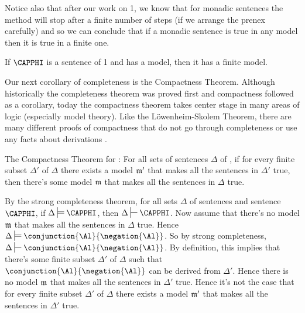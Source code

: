 Notice also that after our work on \GQL{}1, we know that for monadic sentences the method will stop after a finite number of steps (if we arrange the prenex carefully) and so we can conclude that if a monadic sentence is true in any model then it is true in a finite one. 
\begin{THEOREM}{}
If $\CAPPHI$ is a sentence of \GQL{}1 and has a model, then it has a finite model.
\end{THEOREM}

Our next corollary of completeness is the Compactness Theorem.
Although historically the completeness theorem was proved first and compactness followed as a corollary, today the compactness theorem takes center stage in many areas of logic (especially model theory). 
Like the L\"owenheim-Skolem Theorem, there are many different proofs of compactness that do not go through completeness or use any facts about derivations \citetext{see \citealt[321]{Kleene1967}, \citealt{Ebbinghaus1985}, \citealt[ch.~5.1]{Hodges1997}, \citealp[63]{Hodges2001}, \citeyear[29]{Hodges2001b}}. 
\begin{THEOREM}{ The Compactness Theorem for \GQL{}:}
For all sets of sentences $\Delta$ of \GQL{}, if for every finite subset $\Delta'$ of $\Delta$ there exists a model $\mathfrak{m}'$ that makes all the sentences in $\Delta'$ true, then there's some model $\mathfrak{m}$ that makes all the sentences in $\Delta$ true. 
\end{THEOREM}
\begin{PROOF}
By the strong completeness theorem, for all sets $\Delta$ of \GQL{} sentences and \GQL{} sentence $\CAPPHI$, if $\Delta\sdtstile{}{}\CAPPHI$, then $\Delta\sststile{}{}\CAPPHI$.
Now assume that there's no model $\mathfrak{m}$ that makes all the sentences in $\Delta$ true. 
Hence $\Delta\sdtstile{}{}\conjunction{\Al}{\negation{\Al}}$.
So by strong completeness, $\Delta\sststile{}{}\conjunction{\Al}{\negation{\Al}}$.
By definition, this implies that there's some finite subset $\Delta'$ of $\Delta$ such that $\conjunction{\Al}{\negation{\Al}}$ can be derived from $\Delta'$. 
Hence there is no model $\mathfrak{m}$ that makes all the sentences in $\Delta'$ true. 
Hence it's not the case that for every finite subset $\Delta'$ of $\Delta$ there exists a model $\mathfrak{m}'$ that makes all the sentences in $\Delta'$ true. 
\end{PROOF}

